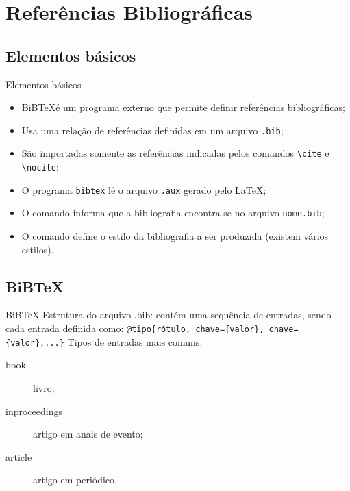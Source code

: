 \section{Refer\^encias Bibliogr\'aficas}
\subsection{Elementos b\'asicos}

\begin{frame}[fragile]{Elementos b\'asicos}
\begin{itemize}
\item BiB\TeX \'e um programa externo que permite definir refer\^encias bibliogr\'aficas;
\item Usa uma rela{\c c}\~ao de refer\^encias definidas em um arquivo \texttt{.bib};
\item S\~ao importadas somente as refer\^encias indicadas pelos comandos \verb|\cite| e \verb|\nocite|;
\item O programa \texttt{bibtex} l\^e o arquivo \texttt{.aux} gerado pelo \LaTeX;
\item O comando \verb|| informa que a bibliografia encontra-se no arquivo \texttt{nome.bib};
\item O comando \verb|| define o estilo da bibliografia a ser produzida (existem v\'arios estilos).
\end{itemize}
\end{frame}

\subsection{BiB\TeX}

\begin{frame}[fragile]{BiB\TeX}
Estrutura do arquivo .bib: cont\'em uma sequ\^encia de entradas, sendo cada entrada definida como:\newline
\newline 
\verb|@tipo{rótulo, chave={valor}, chave={valor},...}|
\newline \newline
Tipos de entradas mais comuns:
\newline
\begin{description}
\item[book] livro;
\item[inproceedings] artigo em anais de evento;
\item[article] artigo em peri\'odico.
\end{description}
\end{frame}

